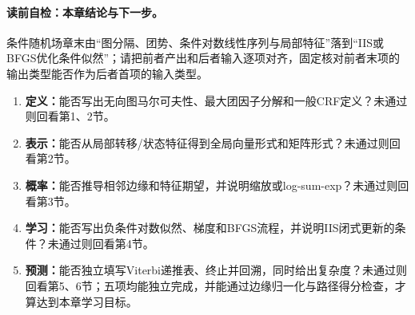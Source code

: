 \begin{SLChapterExercisePairSection}
\end{SLChapterExercisePairSection}
\paragraph{读前自检：本章结论与下一步。}条件随机场章末由“图分隔、团势、条件对数线性序列与局部特征”落到“IIS或BFGS优化条件似然”；请把前者产出和后者输入逐项对齐，固定核对前者末项的输出类型能否作为后者首项的输入类型。\par

\begin{SLCompactClosure}
\label{struct:V3-C06-CH36}

\label{struct:V3-C06-CH37}
\begin{selfcheckbox}
\begin{enumerate}[leftmargin=2.2em]
  \item \textbf{定义：}能否写出无向图马尔可夫性、最大团因子分解和一般CRF定义？未通过则回看第1、2节。
  \item \textbf{表示：}能否从局部转移/状态特征得到全局向量形式和矩阵形式？未通过则回看第2节。
  \item \textbf{概率：}能否推导相邻边缘和特征期望，并说明缩放或log-sum-exp？未通过则回看第3节。
  \item \textbf{学习：}能否写出负条件对数似然、梯度和BFGS流程，并说明IIS闭式更新的条件？未通过则回看第4节。
  \item \textbf{预测：}能否独立填写Viterbi递推表、终止并回溯，同时给出复杂度？未通过则回看第5、6节；五项均能独立完成，并能通过边缘归一化与路径得分检查，才算达到本章学习目标。
\end{enumerate}
\end{selfcheckbox}
\end{SLCompactClosure}
